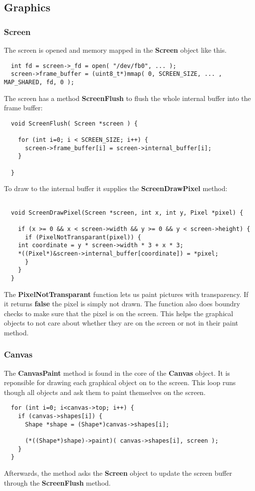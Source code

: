 \subsection{Graphics}

\subsubsection{Screen}

The screen is opened and memory mapped in the {\bf Screen} object like this.
\\
\begin{lstlisting}
  int fd = screen->_fd = open( "/dev/fb0", ... );
  screen->frame_buffer = (uint8_t*)mmap( 0, SCREEN_SIZE, ... , MAP_SHARED, fd, 0 );
\end{lstlisting}
The screen has a method {\bf ScreenFlush} to flush the whole internal buffer into the frame buffer:
\\
\begin{lstlisting}
  void ScreenFlush( Screen *screen ) {

    for (int i=0; i < SCREEN_SIZE; i++) {
      screen->frame_buffer[i] = screen->internal_buffer[i];
    }

  }
\end{lstlisting}
To draw to the internal buffer it supplies the {\bf ScreenDrawPixel} method:
\\
\begin{lstlisting}

  void ScreenDrawPixel(Screen *screen, int x, int y, Pixel *pixel) {

    if (x >= 0 && x < screen->width && y >= 0 && y < screen->height) {
      if (PixelNotTransparant(pixel)) {
	int coordinate = y * screen->width * 3 + x * 3;
	*((Pixel*)&screen->internal_buffer[coordinate]) = *pixel;
      }
    }
  }
\end{lstlisting}
The {\bf PixelNotTransparant} function lets us paint pictures with
transparency. If it returns {\bf false} the pixel is simply not drawn.
The function also does boundry checks to make sure that the pixel is
on the screen. This helps the graphical objects to not care about
whether they
are on the screen or not in their paint method.

\subsubsection{Canvas}
The {\bf CanvasPaint} method is found in the core of the {\bf Canvas} object.
It is reponsible for drawing each graphical object on to the
screen. This loop runs though all objects and ask them to paint themselves
 on the screen.
\\
\begin{lstlisting}
  for (int i=0; i<canvas->top; i++) {
    if (canvas->shapes[i]) {
      Shape *shape = (Shape*)canvas->shapes[i];

      (*((Shape*)shape)->paint)( canvas->shapes[i], screen );
    }
  }
\end{lstlisting}
Afterwards, the method asks the {\bf Screen} object to update the screen
buffer through the {\bf ScreenFlush} method.

